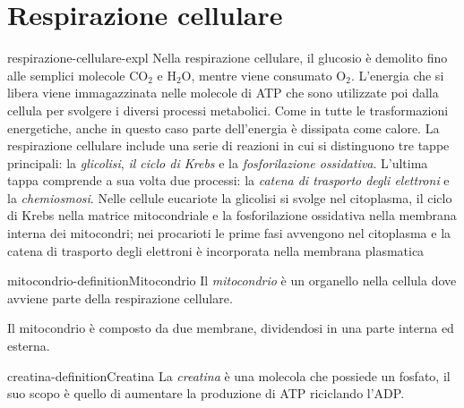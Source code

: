 \documentclass[preview]{standalone}
\begin{document}
\genpage

\section{Respirazione cellulare}

\begin{snippet}{respirazione-cellulare-expl}
    Nella respirazione cellulare, il glucosio è demolito fino alle semplici molecole CO\({}_2\) e H\({}_2\)O,
    mentre viene consumato O\({}_2\). L'energia che si libera viene immagazzinata nelle molecole di
    ATP che sono utilizzate poi dalla cellula per svolgere i diversi processi metabolici. Come in
    tutte le trasformazioni energetiche, anche in questo caso parte dell'energia è dissipata come
    calore. La respirazione cellulare include una serie di reazioni in cui si distinguono tre tappe
    principali: la \textit{glicolisi}, \textit{il ciclo di Krebs} e la \textit{fosforilazione ossidativa}.
    L'ultima tappa comprende a sua volta due processi:
    la \textit{catena di trasporto degli elettroni} e la \textit{chemiosmosi}. Nelle cellule
    eucariote la glicolisi si svolge nel citoplasma, il ciclo di Krebs nella matrice mitocondriale e
    la fosforilazione ossidativa nella membrana interna dei mitocondri; nei procarioti le prime
    fasi avvengono nel citoplasma e la catena di trasporto degli elettroni è incorporata nella
    membrana plasmatica
\end{snippet}


\begin{snippetdefinition}{mitocondrio-definition}{Mitocondrio}
    Il \textit{mitocondrio} è un organello nella cellula dove avviene parte della respirazione cellulare.
\end{snippetdefinition}

\begin{plainhtml}
    Il mitocondrio è composto da due membrane, dividendosi in una parte interna ed esterna.
\end{plainhtml}

\begin{snippetdefinition}{creatina-definition}{Creatina}
    La \textit{creatina} è una molecola che possiede un fosfato, il suo scopo è quello di aumentare la produzione di ATP riciclando l'ADP.
\end{snippetdefinition}
\end{document}
